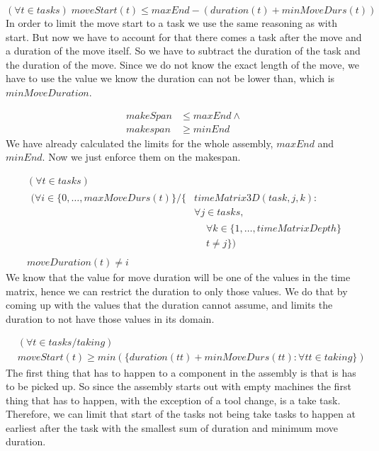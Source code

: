   \begin{equation}\label{eq:63}
  (\forall t \in tasks) \; moveStart(t) \le maxEnd-(duration(t)+minMoveDurs(t))
  \end{equation}
  In order to limit the move start to a task we use the same reasoning as with start. But now we have to account for that there comes a task after the move and a duration of the move itself. So we have to subtract the duration of the task and the duration of the move. Since we do not know the exact length of the move, we have to use the value we know the duration can not be lower than, which is $minMoveDuration$.
  
  \begin{equation}\label{eq:66}
  \begin{aligned}
  makeSpan &\le maxEnd \land\\
  makespan &\ge minEnd
  \end{aligned}
  \end{equation}
  We have already calculated the limits for the whole assembly, $maxEnd$ and $minEnd$. Now we just enforce them on the makespan.
  
  \begin{equation}
  \begin{aligned}\label{eq:67}
  &(\forall t \in tasks)\\
  &\begin{aligned}
  (\forall i \in \{0 , \ldots , maxMoveDurs(t)\} / \{&timeMatrix3D(task,j,k) :\\
  &\forall j \in tasks,\\
  &\begin{aligned}
  &\forall k \in \{1 , \ldots , timeMatrixDepth\}\\
  &t \neq j\})
  \end{aligned}
  \end{aligned}\\
  &moveDuration(t) \neq i
  \end{aligned}
  \end{equation}
 We know that the value for move duration will be one of the values in the time matrix, hence we can restrict the duration to only those values. We do that by coming up with the values that the duration cannot assume, and limits the duration to not have those values in its domain.
  
  \begin{equation}
  \begin{aligned}\label{eq:69}
  &(\forall t \in tasks / taking) \\
  &moveStart(t) \ge min(\{duration(tt) + minMoveDurs(tt) : \forall tt \in taking\})
  \end{aligned}
  \end{equation}
  The first thing that has to happen to a component in the assembly is that is has to be picked up. So since the assembly starts out with empty machines the first thing that has to happen, with the exception of a tool change, is a take task. Therefore, we can limit that start of the tasks not being take tasks to happen at earliest after the task with the smallest sum of duration and minimum move duration.
  
